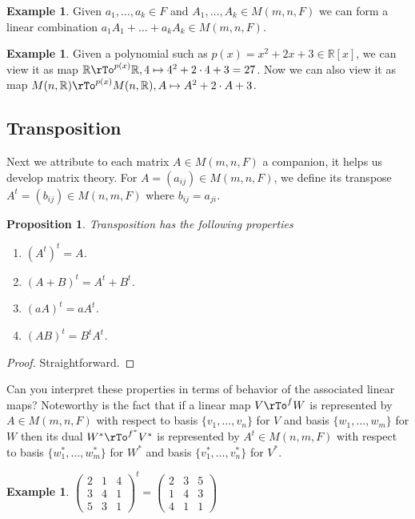 \documentclass[12pt]{amsart}
\newtheorem{proposition}[theorem]{Proposition}
\theoremstyle{definition}
\newtheorem{example}[theorem]{Example}
\begin{document}
\begin{example} Given $a_1, \dots , a_k \in F$ and $A_1, \dots , A_k \in M(m, n,F)$ we can form a linear combination $a_1 A_1 + \ldots + a_k A_k \in M(m, n,F)$.
\end{example}

\begin{example} Given a polynomial such as $p(x) = x^2 + 2x + 3 \in \mathbb{R}[x]$, we can view it as map $\mathbb{R} \rTo^{p(x)} \mathbb{R}, 4 \mapsto 4^2 + 2 \cdot 4 + 3 = 27$. Now we can also view it as map $M(n, \mathbb{R}) \rTo^{p(x)} M(n, \mathbb{R}), A \mapsto A^2 + 2 \cdot A + 3$.
\end{example}

\subsection{Transposition} Next we attribute to each matrix $A \in M(m, n, F)$ a companion, it helps us develop matrix theory.
\dfn For $A = (a_{ij}) \in M(m, n, F)$, we define its transpose $A^t = (b_{ij}) \in M(n, m, F)$ where $b_{ij} = a_{ji}$.

\begin{proposition} Transposition has the following properties
\begin{enumerate}[\indent 1.]
\item $(A^t)^t = A$.
\item $(A + B)^t = A^t + B^t$.
\item $(a A)^t = a A^t$.
\item $(AB)^t = B^t A^t$.
\end{enumerate}
\end{proposition}
\begin{proof} Straightforward.
\end{proof}

Can you interpret these properties in terms of behavior of the associated linear maps? Noteworthy is the fact that if a linear map $V \rTo^f W$ is represented by $A \in M(m, n, F)$ with respect to basis $\{v_1, \dots , v_n\}$ for $V$ and basis $\{w_1, \dots , w_m\}$ for $W$ then its dual $W^* \rTo^{f^*} V^*$ is represented by $A^t \in M(n, m, F)$ with respect to basis $\{w_1^*, \dots , w_m^*\}$ for $W^*$ and basis $\{v_1^*, \dots , v_n^*\}$ for $V^*$.

\begin{example} $\left(\begin{array}{ccc} 2 & 1 & 4 \\  3 & 4 & 1 \\ 5 & 3 & 1 \end{array}\right)^t = \left(\begin{array}{ccc} 2 & 3 & 5 \\  1 & 4 & 3 \\ 4 & 1 & 1 \end{array}\right)$
\end{example}
\end{document}
